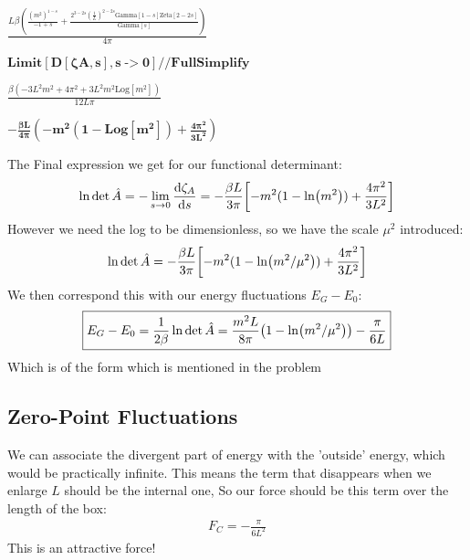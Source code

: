 \documentclass[12pt]{article}
\newcommand{\A}{\hat{A}}
\begin{document}
\begin{doublespace}
\noindent\(\frac{L \beta  \left(\frac{\left(m^2\right)^{1-s}}{-1+s}+\frac{2^{3-2 s} \left(\frac{1}{L}\right)^{2-2 s} \text{Gamma}[1-s] \text{Zeta}[2-2
s]}{\text{Gamma}[s]}\right)}{4 \pi }\)
\end{doublespace}

\begin{doublespace}
\noindent\(\pmb{\text{Limit}[D[\text{$\zeta $A},s],s\text{-$>$}0]\text{//}\text{FullSimplify}}\)
\end{doublespace}

\begin{doublespace}
\noindent\(\frac{\beta  \left(-3 L^2 m^2+4 \pi ^2+3 L^2 m^2 \text{Log}\left[m^2\right]\right)}{12 L \pi }\)
\end{doublespace}

\begin{doublespace}
\noindent\(\pmb{-\frac{\beta  L}{4\pi }\left(-m^2\left(1-\text{Log}\left[m^2\right]\right)+\frac{4 \pi ^2}{3L^2}\right)}\)
\end{doublespace}
The Final expression we get for our functional determinant:
\begin{align*}
  \ln\det\A=-\lim_{s\to0}\dv{\zeta_A}{s}=-\frac{\beta L}{3\pi}
  \qty[-m^2(1-\ln(m^2))+\frac{4\pi^2}{3L^2}]
\end{align*}
However we need the log to be dimensionless, so we have the scale $\mu^2$ introduced:
\begin{align*}
  \ln\det\A=-\frac{\beta L}{3\pi}
  \qty[-m^2(1-\ln(m^2/\mu^2))+\frac{4\pi^2}{3L^2}]
\end{align*}
We then correspond this with our energy fluctuations $E_G-E_0$:
\begin{align*}
  \boxed{E_G-E_0=\frac1{2\beta}\ln\det\A=\frac{m^2L}{8\pi}\qty(1-\ln(m^2/\mu^2))
  -\frac{\pi}{6L}}
\end{align*}
Which is of the form which is mentioned in the problem
\subsection{Zero-Point Fluctuations}
We can associate the divergent part of energy with the 'outside' energy, which would be practically infinite. This means the term that disappears when we enlarge $L$ should be the internal one, So our force should be this term over the length of the box:
\begin{align*}
  \boxed{F_{C}=-\frac{\pi}{6L^2}}
\end{align*}
This is an attractive force!
\end{document}
